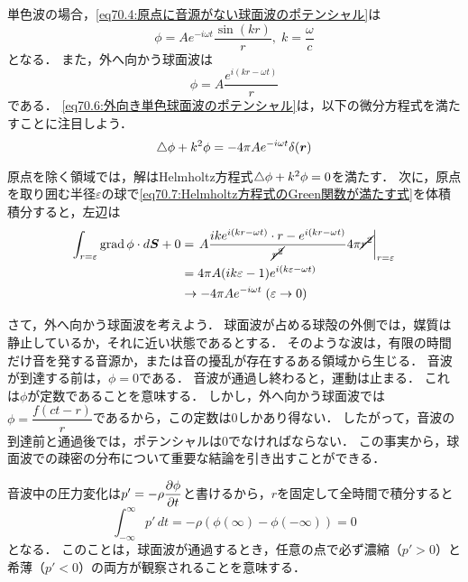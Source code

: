 単色波の場合，\eqref{eq70.4:原点に音源がない球面波のポテンシャル}は
\begin{equation}\label{eq70.5:単色球面波のポテンシャル}
    \phi = A e^{-i\omega t} \frac{\sin(kr)}{r}, \; k = \frac{\omega}{c} 
\end{equation}
となる．
また，外へ向かう球面波は
\begin{equation}\label{eq70.6:外向き単色球面波のポテンシャル}
    \phi = A \frac{e^{i(kr-\omega t)}}{r}
\end{equation}
である．
\eqref{eq70.6:外向き単色球面波のポテンシャル}は，以下の微分方程式を満たすことに注目しよう．
\begin{equation}\label{eq70.7:Helmholtz方程式のGreen関数が満たす式}
    \triangle \phi + k^2 \phi = -4\pi A e^{-i\omega t} \delta(\vb*{r})
\end{equation}

\begin{details}
原点を除く領域では，解はHelmholtz方程式$\triangle \phi + k^2 \phi = 0$を満たす．
次に，原点を取り囲む半径$\varepsilon$の球で\eqref{eq70.7:Helmholtz方程式のGreen関数が満たす式}を体積積分すると，左辺は
\begin{align*}
    \int_{r=\varepsilon} \Grad \phi \cdot \dS + 0
    &= \eval{ A \frac{ ik e^{i(kr-\omega t)} \cdot r - e^{i(kr-\omega t)} }{\cancel{r^2}} 4\pi \cancel{r^2} }_{r=\varepsilon} \\
    &= 4\pi A (ik\varepsilon-1)e^{i(k\varepsilon-\omega t)} \\
    &\to -4\pi A e^{-i\omega t} \; (\varepsilon\to 0)
\end{align*}
\end{details}


さて，外へ向かう球面波を考えよう．
球面波が占める球殻の外側では，媒質は静止しているか，それに近い状態であるとする．
そのような波は，有限の時間だけ音を発する音源か，または音の擾乱が存在するある領域から生じる．
音波が到達する前は，$\phi=0$である．
音波が通過し終わると，運動は止まる．
これは$\phi$が定数であることを意味する．
しかし，外へ向かう球面波では$\phi = \dfrac{f(ct-r)}{r}$であるから，この定数は0しかあり得ない．
したがって，音波の到達前と通過後では，ポテンシャルは0でなければならない．
この事実から，球面波での疎密の分布について重要な結論を引き出すことができる．


音波中の圧力変化は$p'=-\rho\dpdv{\phi}{t}$と書けるから，$r$を固定して全時間で積分すると
\begin{equation}
    \int_{-\infty}^{\infty} p' \, dt = -\rho (\phi(\infty)-\phi(-\infty)) = 0 
\end{equation}
となる．
このことは，球面波が通過するとき，任意の点で必ず濃縮（$p'>0$）と希薄（$p'<0$）の両方が観察されることを意味する．






